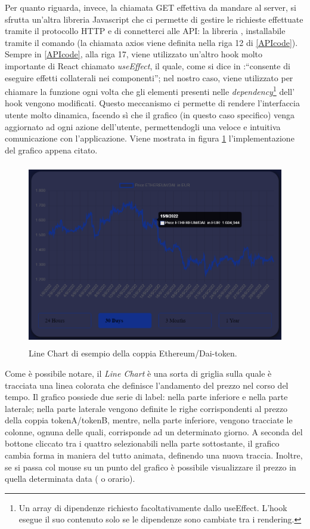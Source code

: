 \label{APIcode}
Per quanto riguarda, invece, la chiamata GET effettiva da mandare al server, si sfrutta un'altra libreria Javascript che ci permette di gestire le richieste effettuate tramite il protocollo HTTP e di connetterci alle API: la libreria , installabile tramite il comando  (la chiamata axios viene definita nella riga 12 di \ref{APIcode}).
Sempre in \ref{APIcode}, alla riga 17, viene utilizzato un'altro hook molto importante di React chiamato \textit{useEffect}, il quale, come si dice in \cite{React} :“consente di eseguire effetti collaterali nei componenti”; nel nostro caso, viene utilizzato per chiamare la funzione  ogni volta che gli elementi presenti nelle \textit{dependency}\footnote{Un array di dipendenze richiesto facoltativamente dallo useEffect. L'hook esegue il suo contenuto solo se le dipendenze sono cambiate tra i rendering.} dell' hook vengono modificati. Questo meccanismo ci permette di rendere l'interfaccia utente molto dinamica, facendo sì che il grafico (in questo caso specifico) venga aggiornato ad ogni azione dell'utente, permettendogli una veloce e intuitiva comunicazione con l'applicazione. Viene mostrata in figura \ref{grafico} l'implementazione del grafico appena citato.

\begin{figure}[h]
    \centering
    \includegraphics[width=13cm,height=8cm]{Immagini/Grafico.png}
    \caption[Line Chart implementato nell'applicativo riferito all'exchange]{Line Chart di esempio della coppia Ethereum/Dai-token.}
    \label{grafico}
\end{figure}
Come è possibile notare, il \textit{Line Chart} è una sorta di griglia sulla quale è tracciata una linea colorata che definisce l'andamento del prezzo nel corso del tempo. Il grafico possiede due serie di label: nella parte inferiore e nella parte laterale; nella parte laterale vengono definite le righe corrispondenti al prezzo della coppia tokenA/tokenB, mentre, nella parte inferiore, vengono tracciate le colonne, ognuna delle quali, corrisponde ad un determinato giorno. A seconda del bottone cliccato tra i quattro selezionabili nella parte sottostante, il grafico cambia forma in maniera del tutto animata, definendo una nuova traccia. Inoltre, se si passa col mouse su un punto del grafico è possibile visualizzare il prezzo in quella determinata data ( o orario).

